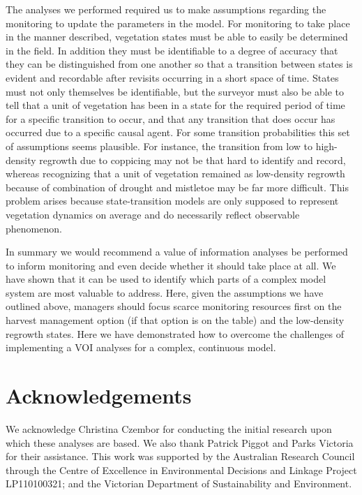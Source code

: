 \documentclass[]{article}
\begin{document}
The analyses we performed required us to make assumptions regarding the
monitoring to update the parameters in the model. For monitoring to take
place in the manner described, vegetation states must be able to easily
be determined in the field. In addition they must be identifiable to a
degree of accuracy that they can be distinguished from one another so
that a transition between states is evident and recordable after
revisits occurring in a short space of time. States must not only
themselves be identifiable, but the surveyor must also be able to tell
that a unit of vegetation has been in a state for the required period of
time for a specific transition to occur, and that any transition that
does occur has occurred due to a specific causal agent. For some
transition probabilities this set of assumptions seems plausible. For
instance, the transition from low to high-density regrowth due to
coppicing may not be that hard to identify and record, whereas
recognizing that a unit of vegetation remained as low-density regrowth
because of combination of drought and mistletoe may be far more
difficult. This problem arises because state-transition models are only
supposed to represent vegetation dynamics on average and do necessarily
reflect observable phenomenon.

In summary we would recommend a value of information analyses be
performed to inform monitoring and even decide whether it should take
place at all. We have shown that it can be used to identify which parts
of a complex model system are most valuable to address. Here, given the
assumptions we have outlined above, managers should focus scarce
monitoring resources first on the harvest management option (if that
option is on the table) and the low-density regrowth states. Here we
have demonstrated how to overcome the challenges of implementing a VOI
analyses for a complex, continuous model. \newpage

\section{Acknowledgements}\label{acknowledgements}

We acknowledge Christina Czembor for conducting the initial research
upon which these analyses are based. We also thank Patrick Piggot and
Parks Victoria for their assistance. This work was supported by the
Australian Research Council through the Centre of Excellence in
Environmental Decisions and Linkage Project LP110100321; and the
Victorian Department of Sustainability and Environment. \newpage
\end{document}
